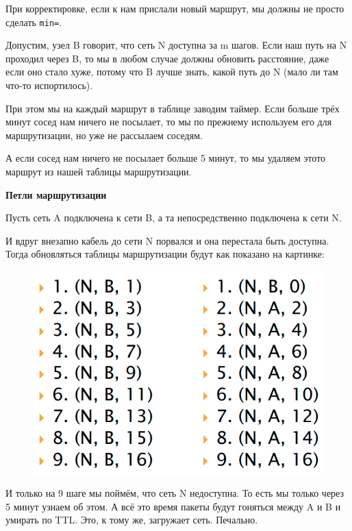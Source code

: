 При корректировке, если к нам прислали новый маршрут, мы должны не просто сделать {\tt min=}.

Допустим, узел B говорит, что сеть N доступна за m шагов. Если наш путь на N проходил через B, то мы в любом случае должны обновить расстояние, даже если оно стало хуже, потому что B лучше знать, какой путь до N (мало ли там что-то испортилось).

При этом мы на каждый маршрут в таблице заводим таймер. Если больше трёх минут сосед нам ничего не посылает, то мы по прежнему используем его для маршрутизации, но уже не рассылаем соседям.

А если сосед нам ничего не посылает больше 5 минут, то мы удаляем этото маршрут из нашей таблицы маршрутизации.

{\bf Петли маршрутизации}

Пусть сеть A подключена к сети B, а та непосредственно подключена к сети N.

И вдруг внезапно кабель до сети N порвался и она перестала быть доступна. Тогда обновляться таблицы маршрутизации будут как показано на картинке:

\begin{figure}[H]
  \centering
  \includegraphics[width=15cm]{images/04/06}
\end{figure}

И только на 9 шаге мы поймём, что сеть N недоступна. То есть мы только через 5 минут узнаем об этом. А всё это время пакеты будут гоняться между A и B и умирать по TTL. Это, к тому же, загружает сеть. Печально.

